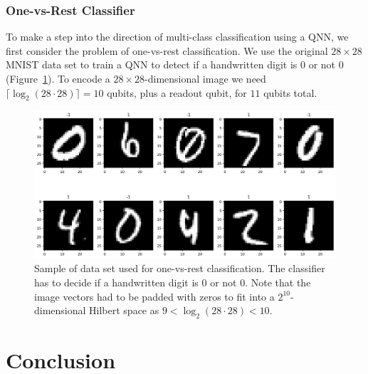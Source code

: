 \documentclass[a4paper,10pt]{article}
\begin{document}
\subsubsection{One-vs-Rest Classifier}
To make a step into the direction of multi-class classification using a QNN, we first consider the problem of one-vs-rest classification.
We use the original $28 \times 28$ MNIST data set to train a QNN to detect if a handwritten digit is 0 or not 0 (Figure~\ref{fig:mnist_ova}).
To encode a $28 \times 28$-dimensional image we need $\lceil \log_2(28 \cdot 28) \rceil = 10$ qubits, plus a readout qubit, for $11$ qubits total.
\begin{figure}[ht]
	\centering
	\includegraphics[width=.95\linewidth]{figures/mnist_28x28_ovr.png}
	\caption{Sample of data set used for one-vs-rest classification. The classifier has to decide if a handwritten digit is 0 or not 0. Note that the image vectors had to be padded with zeros to fit into a $2^{10}$-dimensional Hilbert space as $9 < \log_2(28 \cdot 28) < 10$.}
	\label{fig:mnist_ova}
\end{figure}

\section{Conclusion} \label{sec:conclusion}

\printbibliography[heading=bibintoc]
\end{document}
